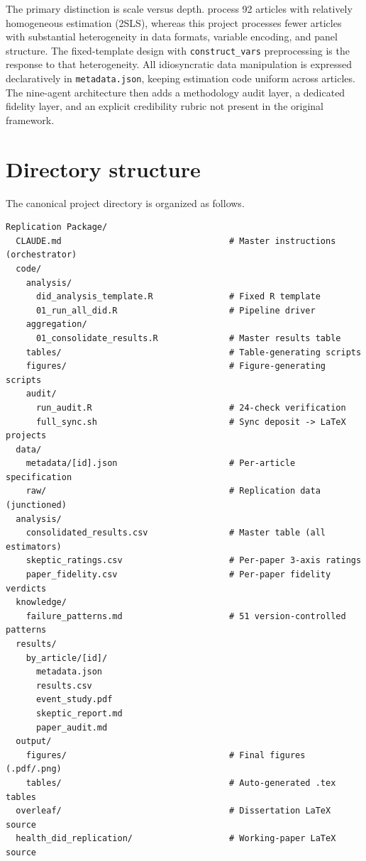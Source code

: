 The primary distinction is scale versus depth. \textcite{xu2026scaling} process 92 articles with relatively homogeneous estimation (2SLS), whereas this project processes fewer articles with substantial heterogeneity in data formats, variable encoding, and panel structure. The fixed-template design with \texttt{construct\_vars} preprocessing is the response to that heterogeneity. All idiosyncratic data manipulation is expressed declaratively in \texttt{metadata.json}, keeping estimation code uniform across articles. The nine-agent architecture then adds a methodology audit layer, a dedicated fidelity layer, and an explicit credibility rubric not present in the original framework.


\section{Directory structure}
\label{sec:appc_directory}

The canonical project directory is organized as follows.

\begin{tcolorbox}[colback=gray!5, colframe=gray!60, width=\textwidth]
\footnotesize
\begin{verbatim}
Replication Package/
  CLAUDE.md                                 # Master instructions (orchestrator)
  code/
    analysis/
      did_analysis_template.R               # Fixed R template
      01_run_all_did.R                      # Pipeline driver
    aggregation/
      01_consolidate_results.R              # Master results table
    tables/                                 # Table-generating scripts
    figures/                                # Figure-generating scripts
    audit/
      run_audit.R                           # 24-check verification
      full_sync.sh                          # Sync deposit -> LaTeX projects
  data/
    metadata/[id].json                      # Per-article specification
    raw/                                    # Replication data (junctioned)
  analysis/
    consolidated_results.csv                # Master table (all estimators)
    skeptic_ratings.csv                     # Per-paper 3-axis ratings
    paper_fidelity.csv                      # Per-paper fidelity verdicts
  knowledge/
    failure_patterns.md                     # 51 version-controlled patterns
  results/
    by_article/[id]/
      metadata.json
      results.csv
      event_study.pdf
      skeptic_report.md
      paper_audit.md
  output/
    figures/                                # Final figures (.pdf/.png)
    tables/                                 # Auto-generated .tex tables
  overleaf/                                 # Dissertation LaTeX source
  health_did_replication/                   # Working-paper LaTeX source
\end{verbatim}
\end{tcolorbox}


